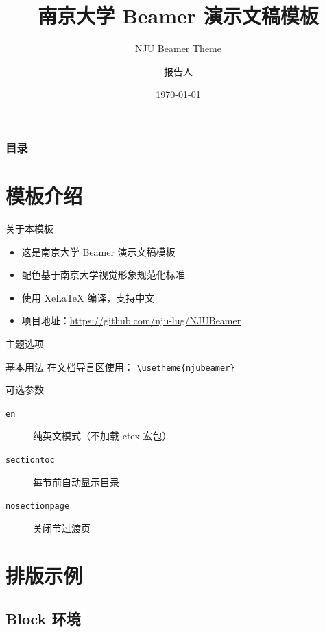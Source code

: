 \documentclass[10pt]{beamer}
\title[南京大学]{南京大学 Beamer 演示文稿模板}
\subtitle{NJU Beamer Theme}
\author[报告人]{报告人}
\institute[南京大学]{南京大学~~计算机科学与技术系}
\date{\today}
\begin{document}
\frame{\titlepage}

\begin{frame}
  \frametitle{目录}
  \tableofcontents
\end{frame}

\section{模板介绍}

\begin{frame}{关于本模板}
  \begin{itemize}
    \item 这是南京大学 Beamer 演示文稿模板
    \item 配色基于南京大学视觉形象规范化标准
    \item 使用 Xe\LaTeX{} 编译，支持中文
    \item 项目地址：\url{https://github.com/nju-lug/NJUBeamer}
  \end{itemize}
\end{frame}

\begin{frame}{主题选项}
  \begin{block}{基本用法}
    在文档导言区使用：
    \texttt{\textbackslash usetheme\{njubeamer\}}
  \end{block}
  \begin{block}{可选参数}
    \begin{description}
      \item[\texttt{en}] 纯英文模式（不加载 ctex 宏包）
      \item[\texttt{sectiontoc}] 每节前自动显示目录
      \item[\texttt{nosectionpage}] 关闭节过渡页
    \end{description}
  \end{block}
\end{frame}


\section{排版示例}

\subsection{Block 环境}
\end{document}
